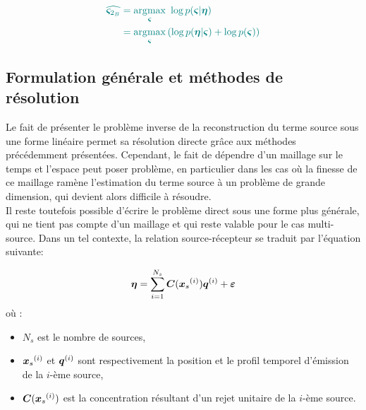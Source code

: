 \begin{equation}
\NdFS{
\begin{split}
\widehat{\VecSigma_{2_B}} &= \argmax_\VecSigma~ \log p(\VecSigma | \VecObs) \\
 &= \argmax_ \VecSigma \left(\log p(\VecObs | \VecSigma) + \log p(\VecSigma)\right)
\label{eq_MAP}
\end{split}
}
\end{equation}

\subsection{Formulation générale et méthodes de résolution}

Le fait de présenter le problème inverse de la reconstruction du terme source sous une forme linéaire permet sa résolution directe grâce aux méthodes précédemment présentées. Cependant, le fait de dépendre d'un maillage sur le temps et l'espace peut poser problème, en particulier dans les cas où la finesse de ce maillage ramène l'estimation du terme source à un problème de grande dimension, qui devient alors difficile à résoudre. \\

Il reste toutefois possible d'écrire le problème direct sous une forme plus générale, qui ne tient pas compte d'un maillage et qui reste valable pour le cas multi-source. Dans un tel contexte, la relation source-récepteur se traduit par l'équation suivante:

\begin{equation}
	{\bm{\eta}} = \sum\limits_{i=1}^{N_s} {\bm{C}}({\bm{x}_s}^{(i)}){\bm{q}}^{(i)} + {\bm{\varepsilon}}
	\label{eq_SR_nonlineaire}
\end{equation}
où :
\begin{itemize}
	\item $N_s$ est le nombre de sources, 
	\item ${\bm{x}_s}^{(i)}$ et ${\bm{q}}^{(i)}$ sont respectivement la position et le profil temporel d'émission de la $i$-ème source,
	\item ${\bm{C}}({\bm{x}_s}^{(i)})$ est la concentration résultant d'un rejet unitaire de la $i$-ème source.\\
\end{itemize}

